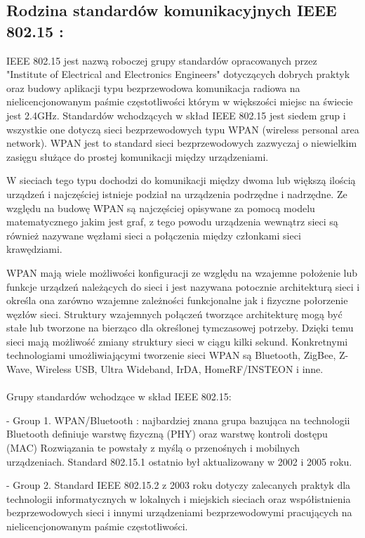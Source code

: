 \subsection{Rodzina standardów komunikacyjnych IEEE 802.15 :} 

\par IEEE 802.15 jest nazwą roboczej grupy standardów opracowanych przez "Institute of Electrical and Electronics Engineers" dotyczących dobrych praktyk oraz budowy aplikacji typu bezprzewodowa komunikacja radiowa na nielicencjonowanym paśmie częstotliwości którym w większości miejsc na świecie jest 2.4GHz. 
Standardów wchodzących w skład IEEE 802.15 jest siedem grup i wszystkie one dotyczą sieci bezprzewodowych typu WPAN (wireless personal area network).
WPAN jest to standard sieci bezprzewodowych zazwyczaj o niewielkim zasięgu służące do prostej komunikacji między urządzeniami. 
\par W sieciach tego typu dochodzi do komunikacji między dwoma lub większą ilością urządzeń i najczęściej istnieje podział na urządzenia podrzędne i nadrzędne.
Ze względu na budowę WPAN są najczęściej opisywane za pomocą modelu matematycznego jakim jest graf, z tego powodu urządzenia wewnątrz sieci są również nazywane węzłami sieci a połączenia między członkami sieci krawędziami.
\par WPAN mają wiele możliwości konfiguracji ze względu na wzajemne położenie lub funkcje urządzeń należących do sieci i jest nazywana potocznie architekturą sieci i określa ona zarówno wzajemne zależności funkcjonalne jak i fizyczne połorzenie węzłów sieci. 
Struktury wzajemnych połączeń tworzące architekturę mogą być stałe lub tworzone na bierząco dla określonej tymczasowej potrzeby. Dzięki temu sieci mają możliwość zmiany struktury sieci w ciągu kilki sekund.
Konkretnymi technologiami umożliwiającymi tworzenie sieci WPAN są Bluetooth, ZigBee, Z-Wave, Wireless USB, Ultra Wideband, IrDA, HomeRF/INSTEON i inne.
\\
\\
{\centering 
 Grupy standardów wchodzące w skład IEEE 802.15:
}
\\
\par - Group 1. WPAN/Bluetooth : najbardziej znana grupa bazująca na technologii Bluetooth definiuje warstwę fizyczną (PHY) oraz warstwę kontroli dostępu (MAC) Rozwiązania te powstały z myślą o przenośnych i mobilnych urządzeniach. Standard 802.15.1 ostatnio był aktualizowany w 2002 i 2005 roku.
\\
\par- Group 2. Standard IEEE 802.15.2 z 2003 roku dotyczy zalecanych praktyk dla technologii informatycznych w lokalnych i miejskich sieciach oraz współistnienia bezprzewodowych sieci i innymi urządzeniami bezprzewodowymi pracujących na nielicencjonowanym paśmie częstotliwości.
